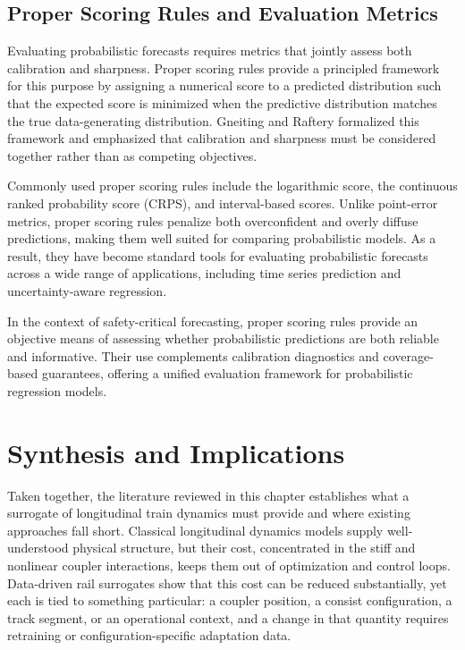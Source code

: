 \subsection{Proper Scoring Rules and Evaluation Metrics}

Evaluating probabilistic forecasts requires metrics that jointly assess both calibration and sharpness. Proper scoring rules provide a principled framework for this purpose by assigning a numerical score to a predicted distribution such that the expected score is minimized when the predictive distribution matches the true data-generating distribution. Gneiting and Raftery \cite{gneiting2007proper} formalized this framework and emphasized that calibration and sharpness must be considered together rather than as competing objectives.

Commonly used proper scoring rules include the logarithmic score, the continuous ranked probability score (CRPS), and interval-based scores. Unlike point-error metrics, proper scoring rules penalize both overconfident and overly diffuse predictions, making them well suited for comparing probabilistic models. As a result, they have become standard tools for evaluating probabilistic forecasts across a wide range of applications, including time series prediction and uncertainty-aware regression.

In the context of safety-critical forecasting, proper scoring rules provide an objective means of assessing whether probabilistic predictions are both reliable and informative. Their use complements calibration diagnostics and coverage-based guarantees, offering a unified evaluation framework for probabilistic regression models.

\section*{Synthesis and Implications}

Taken together, the literature reviewed in this chapter establishes what a surrogate of longitudinal train dynamics must provide and where existing approaches fall short. Classical longitudinal dynamics models supply well-understood physical structure, but their cost, concentrated in the stiff and nonlinear coupler interactions, keeps them out of optimization and control loops. Data-driven rail surrogates show that this cost can be reduced substantially, yet each is tied to something particular: a coupler position, a consist configuration, a track segment, or an operational context, and a change in that quantity requires retraining or configuration-specific adaptation data.


